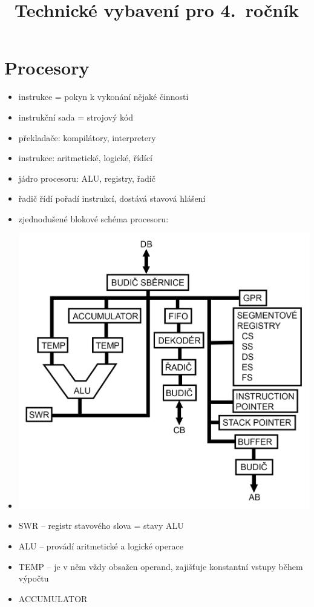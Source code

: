 \documentclass[a4paper,12pt]{article}
\title{Technické vybavení pro 4.~ročník}
\author{}
\date{}
\providecommand{\tightlist}{%
\setlength{\itemsep}{0pt}\setlength{\parskip}{0pt}}
\begin{document}
\maketitle

\section{Procesory}

\begin{itemize}
  \tightlist
  \item instrukce = pokyn k vykonání nějaké činnosti
  \item instrukční sada = strojový kód
  \item překladače: kompilátory, interpretery
  \item instrukce: aritmetické, logické, řídící
  \item jádro procesoru: ALU, registry, řadič
  \item řadič řídí pořadí instrukcí, dostává stavová hlášení
  \item zjednodušené blokové schéma procesoru:
  \item[] \includegraphics[width=16cm]{ref/blokove-schema-procesoru.png}
  \newpage
  \item SWR -- registr stavového slova = stavy ALU
  \item ALU -- provádí aritmetické a logické operace
  \item TEMP -- je v něm vždy obsažen operand, zajišťuje konstantní vstupy
  během výpočtu
  \item ACCUMULATOR
  

\end{itemize}
\end{document}

